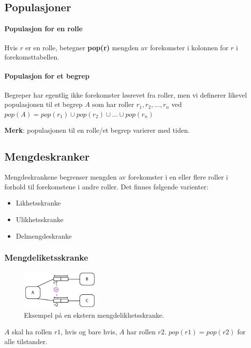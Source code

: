 \documentclass[11pt,a4paper]{article}
\begin{document}
\subsection{Populasjoner}
\paragraph{Populasjon for en rolle}
Hvis $r$ er en rolle, betegner \textbf{pop(r)} mengden av forekomster i kolonnen for $r$ i forekomsttabellen.

\paragraph{Populasjon for et begrep}
Begreper har egentlig ikke forekomster løsrevet fra roller, men vi definerer likevel populasjonen til et begrep $A$ som har roller $r_1, r_2, \dots, r_n$ ved $pop(A) = pop(r_1) \cup pop(r_2) \cup \dots \cup pop(r_n)$

\textbf{Merk}: populasjonen til en rolle/et begrep varierer med tiden.

\subsection{Mengdeskranker}
Mengdeskrankene begrenser mengden av forekomster i en eller flere roller i forhold til forekomstene i andre roller. Det finnes følgende varienter: 
\begin{itemize}
\item{Likhetsskranke}
\item{Ulikhetsskranke}
\item{Delmengdeskranke}
\end{itemize}

\subsubsection{Mengdeliketsskranke}

\begin{figure}[h!]
	\centering
		\includegraphics[width=150px]{img/men-01.png}
	\caption{Eksempel på en ekstern mengdelikhetsskranke.}
\end{figure}

$A$ skal ha rollen $r1$, hvis og bare hvis, $A$ har rollen $r2$. 
$pop(r1) = pop(r2)$ for alle tilstander.
\end{document}
